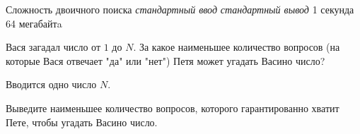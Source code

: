 \begin{problem}%
{Сложность двоичного поиска}%
{\textsl{стандартный ввод}}%
{\textsl{стандартный вывод}}%
{1 секунда}%
{64 мегабайтa}{}

Вася загадал число от $1$ до $N$. За какое наименьшее количество вопросов (на которые Вася отвечает "да" или "нет") Петя может угадать Васино число?

\InputFile

Вводится одно число $N$.

\OutputFile

Выведите наименьшее количество вопросов, которого гарантированно хватит Пете, чтобы угадать Васино число.

\Examples

\begin{example}
%
\end{example}
\end{problem}
